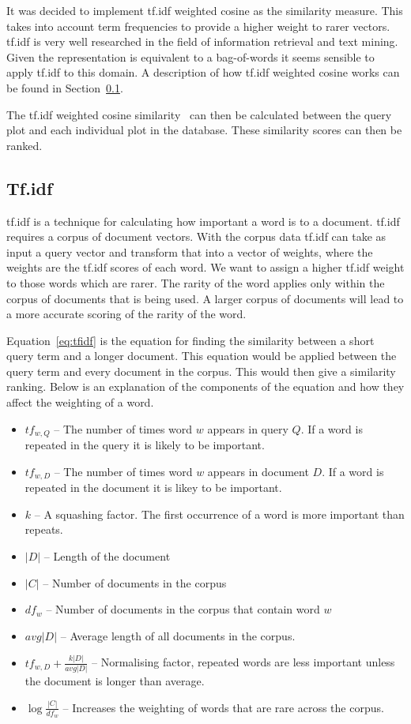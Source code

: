 It was decided to implement \ac{tf.idf} weighted cosine as the similarity measure.  This takes into account term frequencies to provide a higher weight to rarer vectors.  \ac{tf.idf} is very well researched in the field of information retrieval and text mining.  Given the representation is equivalent to a bag-of-words it seems sensible to apply \ac{tf.idf} to this domain.  A description of how \ac{tf.idf} weighted cosine works can be found in Section~\ref{sec:tfidf}.

The tf.idf weighted cosine similarity~\cite[p.~243]{se_book} can then be calculated between the query plot and each individual plot in the database.  These similarity scores can then be ranked.

\subsection{Tf.idf}
\label{sec:tfidf}

\ac{tf.idf} is a technique for calculating how important a word is to a document.  \ac{tf.idf} requires a corpus of document vectors.  With the corpus data \ac{tf.idf} can take as input a query vector and transform that into a vector of weights, where the weights are the \ac{tf.idf} scores of each word.  We want to assign a higher \ac{tf.idf} weight to those words which are rarer.  The rarity of the word applies only within the corpus of documents that is being used.  A larger corpus of documents will lead to a more accurate scoring of the rarity of the word.

Equation~\ref{eq:tfidf} is the equation for finding the similarity between a short query term and a longer document.  This equation would be applied between the query term and every document in the corpus.  This would then give a similarity ranking.  Below is an explanation of the components of the equation and how they affect the weighting of a word.

\begin{itemize}
    \item $tf_{w,Q}$ -- The number of times word $w$ appears in query $Q$.  If a word is repeated in the query it is likely to be important.
    \item $tf_{w,D}$ -- The number of times word $w$ appears in document $D$.  If a word is repeated in the document it is likey to be important.
    \item $k$ -- A squashing factor.  The first occurrence of a word is more important than repeats.
    \item $|D|$ -- Length of the document
    \item $|C|$ -- Number of documents in the corpus
    \item $df_{w}$ -- Number of documents in the corpus that contain word $w$
    \item $avg|D|$ -- Average length of all documents in the corpus.
    \item $tf_{w,D} + \frac{k|D|}{avg|D|}$ -- Normalising factor, repeated words are less important unless the document is longer than average.
    \item $\log \frac{|C|}{df_{w}}$ -- Increases the weighting of words that are rare across the corpus.
\end{itemize}

